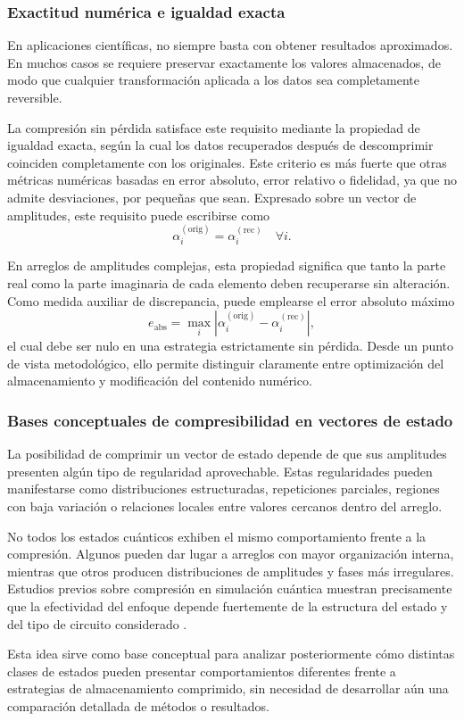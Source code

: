 \subsubsection{Exactitud numérica e igualdad exacta}

En aplicaciones científicas, no siempre basta con obtener resultados aproximados. En muchos casos se requiere preservar exactamente los valores almacenados, de modo que cualquier transformación aplicada a los datos sea completamente reversible.

La compresión sin pérdida satisface este requisito mediante la propiedad de igualdad exacta, según la cual los datos recuperados después de descomprimir coinciden completamente con los originales. Este criterio es más fuerte que otras métricas numéricas basadas en error absoluto, error relativo o fidelidad, ya que no admite desviaciones, por pequeñas que sean. Expresado sobre un vector de amplitudes, este requisito puede escribirse como
\[
    \alpha_i^{(\text{orig})} = \alpha_i^{(\text{rec})} \quad \forall i.
\]

En arreglos de amplitudes complejas, esta propiedad significa que tanto la parte real como la parte imaginaria de cada elemento deben recuperarse sin alteración. Como medida auxiliar de discrepancia, puede emplearse el error absoluto máximo
\[
    e_{\text{abs}} = \max_i \left|\alpha_i^{(\text{orig})} - \alpha_i^{(\text{rec})}\right|,
\]
el cual debe ser nulo en una estrategia estrictamente sin pérdida. Desde un punto de vista metodológico, ello permite distinguir claramente entre optimización del almacenamiento y modificación del contenido numérico.

\subsubsection{Bases conceptuales de compresibilidad en vectores de estado}

La posibilidad de comprimir un vector de estado depende de que sus amplitudes presenten algún tipo de regularidad aprovechable. Estas regularidades pueden manifestarse como distribuciones estructuradas, repeticiones parciales, regiones con baja variación o relaciones locales entre valores cercanos dentro del arreglo.

No todos los estados cuánticos exhiben el mismo comportamiento frente a la compresión. Algunos pueden dar lugar a arreglos con mayor organización interna, mientras que otros producen distribuciones de amplitudes y fases más irregulares. Estudios previos sobre compresión en simulación cuántica muestran precisamente que la efectividad del enfoque depende fuertemente de la estructura del estado y del tipo de circuito considerado \cite{wu2018amplitude,wu2019full}.

Esta idea sirve como base conceptual para analizar posteriormente cómo distintas clases de estados pueden presentar comportamientos diferentes frente a estrategias de almacenamiento comprimido, sin necesidad de desarrollar aún una comparación detallada de métodos o resultados.

